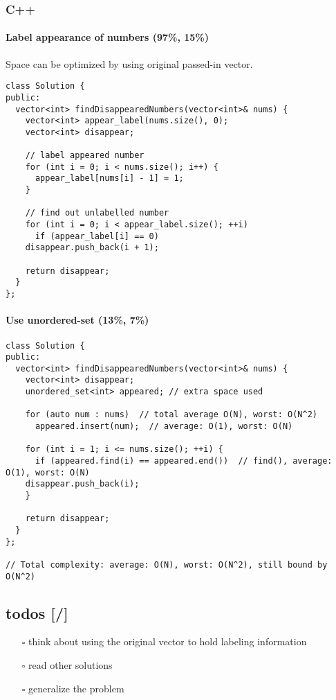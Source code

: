 \documentclass[12pt]{article}
\begin{document}
\subsubsection{C++}
\label{sec:org09a1547}
\paragraph{Label appearance of numbers (97\%, 15\%)}
\label{sec:orgbe1f66f}
Space can be optimized by using original passed-in vector.
\begin{verbatim}
class Solution {
public:
  vector<int> findDisappearedNumbers(vector<int>& nums) {
    vector<int> appear_label(nums.size(), 0);
    vector<int> disappear;

    // label appeared number
    for (int i = 0; i < nums.size(); i++) {
      appear_label[nums[i] - 1] = 1;
    }

    // find out unlabelled number 
    for (int i = 0; i < appear_label.size(); ++i)
      if (appear_label[i] == 0)
	disappear.push_back(i + 1);

    return disappear;
  }
};
\end{verbatim}
\paragraph{Use unordered-set (13\%, 7\%)}
\label{sec:org30b2c73}
\begin{verbatim}
class Solution {
public:
  vector<int> findDisappearedNumbers(vector<int>& nums) {
    vector<int> disappear;
    unordered_set<int> appeared; // extra space used

    for (auto num : nums)  // total average O(N), worst: O(N^2)
      appeared.insert(num);  // average: O(1), worst: O(N)

    for (int i = 1; i <= nums.size(); ++i) {
      if (appeared.find(i) == appeared.end())  // find(), average: O(1), worst: O(N)
	disappear.push_back(i);
    }

    return disappear;
  }
};

// Total complexity: average: O(N), worst: O(N^2), still bound by O(N^2)
\end{verbatim}
\subsection{todos [/]}
\label{sec:org2be045b}
\begin{itemize}
\item[{$\square$}] think about using the original vector to hold labeling information
\item[{$\square$}] read other solutions
\item[{$\square$}] generalize the problem
\end{itemize}
\end{document}
